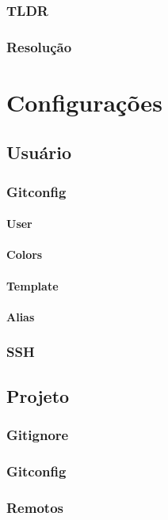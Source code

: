 \documentclass{apostila}
\begin{document}
\subsection{TLDR}
\subsection{Resolução}


\chapter{Configurações}
\section{Usuário}
\subsection{Gitconfig}
\subsubsection{User}
\subsubsection{Colors}
\subsubsection{Template}
\subsubsection{Alias}
\subsection{SSH}

\section{Projeto}
\subsection{Gitignore}
\subsection{Gitconfig}
\subsection{Remotos}
\end{document}
